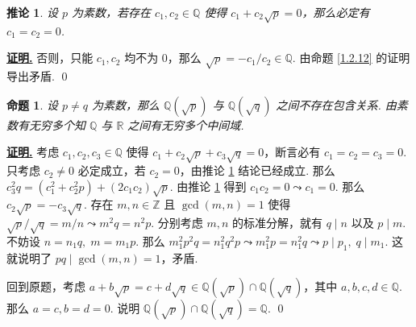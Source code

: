 \documentclass[10pt,openany]{article}
\theoremstyle{thmstyle} %
\theoremstyle{defstyle} %
\newtheorem{corollary}[theorem]{推论}
\theoremstyle{prostyle} %
\newtheorem{proposition}[theorem]{命题}
\renewenvironment{proof}[1][证明]{\par\underline{\textbf{#1.}} \;\fangsong}{\qed\par}
\begin{document}
\begin{corollary}
	设 \( p \) 为素数，若存在 \( c_1,c_2 \in \mathbb{Q} \) 使得 \( c_1+c_2\sqrt{p}=0 \)，那么必定有 \( c_1=c_2=0 \).
	\label{1.2.13}
\end{corollary}

\begin{proof}
	否则，只能 \( c_1,c_2 \) 均不为 0，那么 \( \sqrt{p}=-c_1/c_2 \in \mathbb{Q} \). 由命题 \ref{1.2.12} 的证明导出矛盾.
\end{proof}

\begin{proposition}
	设 \( p \neq q \) 为素数，那么 \( \mathbb{Q}(\sqrt{p}) \) 与 \( \mathbb{Q}(\sqrt{q}) \) 之间不存在包含关系. 由素数有无穷多个知 \( \mathbb{Q} \) 与 \( \mathbb{R} \) 之间有无穷多个中间域.
\end{proposition}

\begin{proof}
	考虑 \( c_1,c_2,c_3 \in \mathbb{Q} \) 使得 \( c_1+c_2\sqrt{p}+c_3\sqrt{q}=0 \)，断言必有 \( c_1=c_2=c_3=0 \). 只考虑 \( c_2 \neq 0 \) 必定成立，若 \( c_2=0 \)，由推论 \ref{1.2.13} 结论已经成立. 那么 \( c_3^2q=(c_1^2+c_2^2p)+(2c_1c_2)\sqrt{p} \). 由推论 \ref{1.2.13} 得到 \( c_1c_2=0 \leadsto c_1=0 \). 那么 \( c_2\sqrt{p}=-c_3\sqrt{q} \). 存在 \( m,n \in \mathbb{Z} \) 且 \( \gcd(m,n)=1 \) 使得 \( \sqrt{p}/\sqrt{q}=m/n \leadsto m^2q=n^2p \). 分别考虑 \( m,n \) 的标准分解，就有 \( q \mid n \) 以及 \( p \mid m \). 不妨设 \( n=n_1q, \; m=m_1p \). 那么 \( m_1^2p^2q=n_1^2q^2p \leadsto m_1^2p=n_1^2q \leadsto p \mid p_1, \; q \mid m_1 \). 这就说明了 \( pq \mid \gcd(m,n)=1 \)，矛盾. 
	
	回到原题，考虑 \( a+b\sqrt{p}=c+d\sqrt{q} \in \mathbb{Q}(\sqrt{p}) \cap \mathbb{Q}(\sqrt{q}) \)，其中 \( a,b,c,d \in \mathbb{Q} \). 那么 \( a=c, b=d=0 \). 说明 \( \mathbb{Q}(\sqrt{p}) \cap \mathbb{Q}(\sqrt{q})=\mathbb{Q} \). 
\end{proof}
\end{document}
